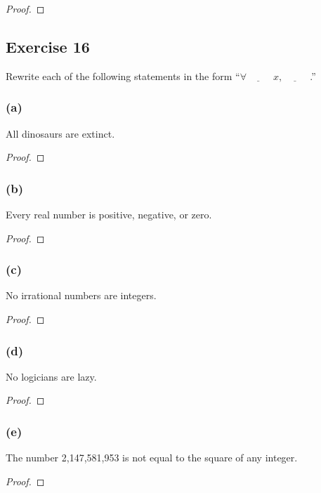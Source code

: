 \documentclass[14pt]{extarticle}
\newcommand{\fbl}{\underline{\hspace{1cm}}\,\,}
\newcommand{\fa}{\forall}
\begin{document}
\begin{proof}

\end{proof}

\subsection{Exercise 16}
Rewrite each of the following statements in the
form “$\fa \fbl x, \fbl$.”

\subsubsection{(a)}
All dinosaurs are extinct.

\begin{proof}

\end{proof}

\subsubsection{(b)}
Every real number is positive, negative, or zero.

\begin{proof}

\end{proof}

\subsubsection{(c)}
No irrational numbers are integers.

\begin{proof}

\end{proof}

\subsubsection{(d)}
No logicians are lazy.

\begin{proof}

\end{proof}

\subsubsection{(e)}
The number 2,147,581,953 is not equal to the square of any integer.

\begin{proof}

\end{proof}
\end{document}
